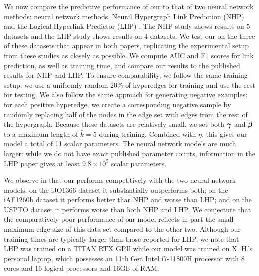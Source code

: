 We now compare the predictive performance of our \model to that of two neural network methods: neural network methods, Neural Hypergraph Link Prediction (NHP) \cite{yadatiNHPNeuralHypergraph2020} and the Logical Hyperlink Predictor (LHP) \cite{yangLHPLogicalHypergraph2023}.
The NHP study \cite{yadatiNHPNeuralHypergraph2020} shows results on 5 datasets and the LHP study \cite{yangLHPLogicalHypergraph2023} shows results on 4 datasets. 
We test our \model on the three of these datasets that appear in both papers, replicating the experimental setup from these studies as closely as possible. 
We compute AUC and F1 scores for link prediction, as well as training time, and compare our results to the published results for NHP and LHP.
To ensure comparability, we follow the same training setup: we use a uniformly random $20\%$ of hyperedges for training and use the rest for testing. 
We also follow the same approach for generating negative examples: for each positive hyperedge, we create a corresponding negative sample by randomly replacing half of the nodes in the edge set with edges from the rest of the hypergraph. 
Because these datasets are relatively small, we set both $\boldsymbol{\gamma}$ and $\boldsymbol{\beta}$ to a maximum length of $\bar{k} = 5$ during training. 
Combined with $\eta$, this gives our model a total of 11 scalar parameters. 
The neural network models are much larger: while we do not have exact published parameter counts, information in the LHP paper gives at least $9.8 \times 10^5$ scalar parameters.

We observe in  that our \model performs competitively with the two neural network models: on the iJO1366 dataset it substantially outperforms both; on the iAF1260b dataset it performs better than NHP and worse than LHP; and on the USPTO dataset it performs worse than both NHP and LHP. 
We conjecture that the comparatively poor performance of our model reflects in part the small maximum edge size of this data set compared to the other two. 
Although our training times are typically larger than those reported for LHP, we note that LHP was trained on a TITAN RTX GPU while our model was trained on X. H.'s personal laptop, which possesses an 11th Gen Intel i7-11800H processor with 8 cores and 16 logical processors and 16GB of RAM. 



